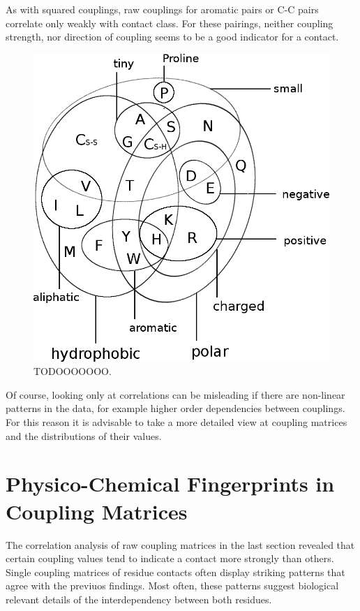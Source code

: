 \documentclass[12pt,a4paper,twoside]{book}
\theoremstyle{definition}
\theoremstyle{definition}
\theoremstyle{remark}
\begin{document}
As with squared couplings, raw couplings for aromatic pairs or C-C pairs
correlate only weakly with contact class. For these pairings, neither
coupling strength, nor direction of coupling seems to be a good
indicator for a contact.



\begin{figure}
\includegraphics[width=1\linewidth]{img/amino_acid_physico_chemical_properties_venn_diagramm} \caption{TODOOOOOOO.}\label{fig:coupling-correlation}
\end{figure}

Of course, looking only at correlations can be misleading if there are
non-linear patterns in the data, for example higher order dependencies
between couplings. For this reason it is advisable to take a more
detailed view at coupling matrices and the distributions of their
values.

\section{Physico-Chemical Fingerprints in Coupling
Matrices}\label{physico-chemical-fingerprints-in-coupling-matrices}

The correlation analysis of raw coupling matrices in the last section
revealed that certain coupling values tend to indicate a contact more
strongly than others. Single coupling matrices of residue contacts often
display striking patterns that agree with the previuos findings. Most
often, these patterns suggest biological relevant details of the
interdependency between both residues.
\end{document}
